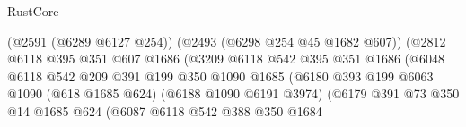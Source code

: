 \begin{lexlean}{RustCore}
\begin{coremodule}
                                                (@2591 (@6289 @6127 @254))
                                                (@2493 (@6298 @254 @45 @1682 @607))
                                                (@2812
                                                  @6118
                                                  @395
                                                  @351
                                                  @607
                                                  @1686
                                                  (@3209
                                                    @6118
                                                    @542
                                                    @395
                                                    @351
                                                    @1686
                                                    (@6048
                                                      @6118
                                                      @542
                                                      @209
                                                      @391
                                                      @199
                                                      @350
                                                      @1090
                                                      @1685
                                                      (@6180
                                                        @393
                                                        @199
                                                        @6063
                                                        @1090
                                                        (@618 @1685 @624)
                                                        (@6188 @1090 @6191 @3974)
                                                        (@6179
                                                          @391
                                                          @73
                                                          @350
                                                          @14
                                                          @1685
                                                          @624
                                                          (@6087
                                                            @6118
                                                            @542
                                                            @388
                                                            @350
                                                            @1684

\end{coremodule}
\end{lexlean}
